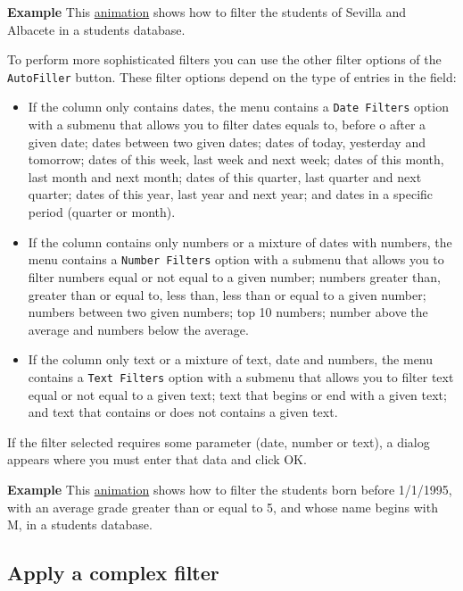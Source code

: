 \textbf{Example} This \href{http://aprendeconalf.es/office/excel/manual/img/example_database_filtering_simple.gif}{animation} shows how to filter the students of Sevilla and Albacete in a students database.

To perform more sophisticated filters you can use the other filter options of the \texttt{AutoFiller} button. These filter options depend on the type of entries in the field:

\begin{itemize}
\item If the column only contains dates, the menu contains a \texttt{Date Filters} option with a submenu that allows you to filter dates equals to, before o after a given date; dates between two given dates; dates of today, yesterday and tomorrow; dates of this week, last week and next week; dates of this month, last month and next month; dates of this quarter, last quarter and next quarter; dates of this year, last year and next year; and dates in a specific period (quarter or month).
\item If the column contains only numbers or a mixture of dates with numbers, the menu contains a \texttt{Number Filters} option with a submenu that allows you to filter numbers equal or not equal to a given number; numbers greater than, greater than or equal to, less than, less than or equal to a given number; numbers between two given numbers; top 10 numbers; number above the average and numbers below the average.
\item If the column only text or a mixture of text, date and numbers, the menu contains a \texttt{Text Filters} option with a submenu that allows you to filter text equal or not equal to a given text; text that begins or end with a given text; and text that contains or does not contains a given text.
\end{itemize}

If the filter selected requires some parameter (date, number or text), a dialog appears where you must enter that data and click OK.

\textbf{Example} This \href{http://aprendeconalf.es/office/excel/manual/img/example_database_filtering_complex.gif}{animation} shows how to filter the students born before 1/1/1995, with an average grade greater than or equal to 5, and whose name begins with M, in a students database.

\subsection{Apply a complex filter}\hypertarget{apply-a-complex-filter}{}\label{apply-a-complex-filter}

